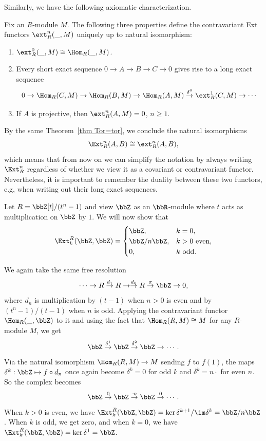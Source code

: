Similarly, we have the following axiomatic characterization.

\begin{thm}
    Fix an $R$-module $M$. The following three properties define the contravariant Ext functors $\ext_R^n(\_,M)$ uniquely up to natural isomorphism: 
    \begin{enumerate}
        \item $\ext^0_R(\_,M)\cong\Hom_R(\_,M)$.
        \item Every short exact sequence $0\to A\to B\to C\to 0$ gives rise to a long exact sequence 
        \[0\to \Hom_R(C,M)\to \Hom_R(B,M)\to \Hom_R(A,M)\overset{\delta^0}{\to} \ext^1_R(C,M)\to\cdots \]
        \item If $A$ is projective, then $\ext_R^n(A,M)=0$, $n\geq 1$.
    \end{enumerate}
\end{thm}

By the same Theorem~\ref{thm Tor=tor}, we conclude the natural isomorphisms
\[\Ext^n_R(A,B)\cong \ext^n_R(A,B),\]
which means that from now on we can simplify the notation by always writing $\Ext_R^n$ regardless of whether we view it as a covariant or contravariant functor. Nevertheless, it is important to remember the duality between these two functors, e.g, when writing out their long exact sequences.


\begin{example}[Continuation of Example~\ref{example Tor with R=Z[t]/(tn-1)}]
    Let $R=\bbZ[t]\slash(t^n-1)$ and view $\bbZ$ as an $\bbR$-module where $t$ acts as multiplication on $\bbZ$ by $1$. We will now show that
        \[\Ext_k^R(\bbZ,\bbZ)=\begin{cases}
            \bbZ,&k=0,\\
            \bbZ\slash n\bbZ,&k>0\text{ even},\\
            0,& k\text{ odd}.
        \end{cases}\]

    We again take the same free resolution
    \[\cdots\to R\overset{d_1}{\to}R\to \overset{d_0}{\to}R \overset{\pi}{\to}\bbZ\to 0,\]
    where $d_n$ is multiplication by $(t-1)$ when $n>0$ is even and by $(t^n-1)/(t-1)$ when $n$ is odd. Applying the contravariant functor $\Hom_R(\_,\bbZ)$ to it and using the fact that $\Hom_R(R,M)\cong M$ for any $R$-module $M$, we get
    \[\bbZ\overset{\delta^1}{\to}\bbZ \overset{\delta^2}{\to}\bbZ\to\cdots .\]
    Via the natural isomorphism $\Hom_R(R,M)\to M$ sending $f$ to $f(1)$, the maps $\delta^k:\bbZ\mapsto f\circ d_n$ once again become $\delta^k=0$ for odd $k$ and $\delta^k=n\cdot$ for even $n$. So the complex becomes
    \[\bbZ\overset{0}{\to}\bbZ\overset{\cdot n}{\to}\bbZ\overset{0}{\to}\cdots.\]
    When $k>0$ is even, we have $\Ext_k^R(\bbZ,\bbZ)=\ker \delta^{k+1}\slash \im\delta^k=\bbZ\slash n\bbZ$. When $k$ is odd, we get zero, and when $k=0$, we have $\Ext^R_k(\bbZ,\bbZ)=\ker \delta^1=\bbZ$. 
\end{example}



